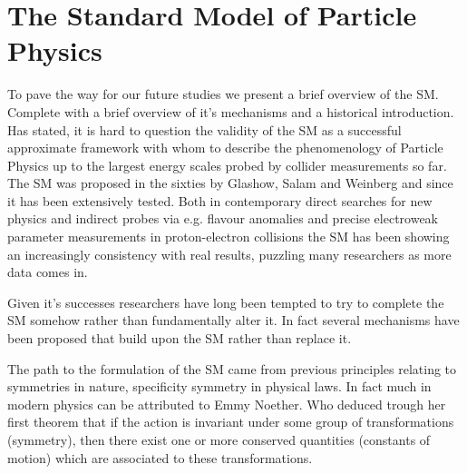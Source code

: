 
\newpage 

\section{The Standard Model of Particle Physics}

To pave the way for our future studies we present a brief overview of the SM. Complete with a brief overview of it's mechanisms and a historical introduction.
%
Has stated, it is hard to question the validity of the SM as a successful approximate framework with whom to describe the phenomenology of Particle Physics up to the largest energy scales probed by collider measurements so far. 
%
The SM was proposed in the sixties by Glashow, Salam and Weinberg and since it has been extensively tested. Both in contemporary direct searches for new physics and indirect probes via e.g. flavour anomalies and precise electroweak parameter measurements in proton-electron collisions the SM has been showing an increasingly consistency with real results, puzzling many researchers as more data comes in. 


%
Given it's successes researchers have long been tempted to try to complete the SM somehow rather than fundamentally alter it. In fact several mechanisms have been proposed that build upon the SM rather than replace it.

The path to the formulation of the SM came from previous principles relating to symmetries in nature, specificity symmetry in physical laws. In fact much in modern physics can be attributed to Emmy Noether. Who deduced trough her first theorem that if the action is invariant under some group of transformations (symmetry), then there exist one or more conserved quantities (constants of motion) which are associated to these transformations. 

